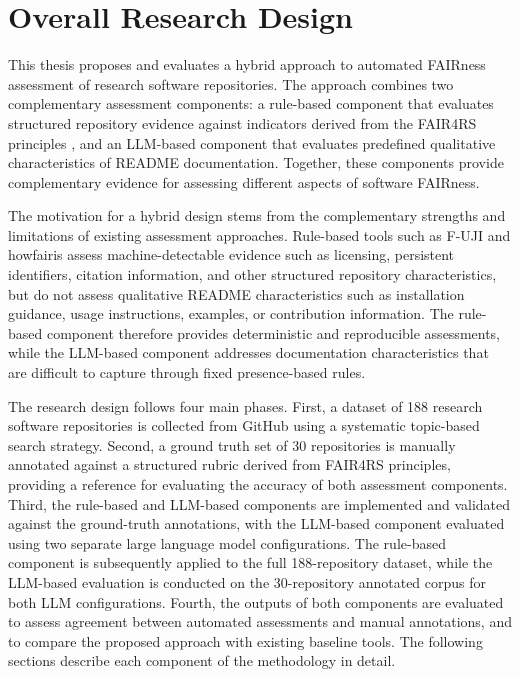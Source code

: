 \section{Overall Research Design}

This thesis proposes and evaluates a hybrid approach to automated
FAIRness assessment of research software repositories. The approach
combines two complementary assessment components: a rule-based
component that evaluates structured repository evidence against
indicators derived from the FAIR4RS principles
\cite{barker2022fair4rs}, and an LLM-based component that evaluates
predefined qualitative characteristics of README documentation.
Together, these components provide complementary evidence for
assessing different aspects of software FAIRness.

The motivation for a hybrid design stems from the complementary
strengths and limitations of existing assessment approaches.
Rule-based tools such as F-UJI \cite{fuji2021} and howfairis assess
machine-detectable evidence such as licensing, persistent
identifiers, citation information, and other structured repository
characteristics, but do not assess qualitative README characteristics
such as installation guidance, usage instructions, examples, or
contribution information. The rule-based component therefore provides
deterministic and reproducible assessments, while the LLM-based
component addresses documentation characteristics that are difficult
to capture through fixed presence-based rules.

The research design follows four main phases. First, a dataset of 
188 research software repositories is collected from GitHub using 
a systematic topic-based search strategy. Second, a ground truth 
set of 30 repositories is manually annotated against a structured 
rubric derived from FAIR4RS principles, providing a reference for 
evaluating the accuracy of both assessment components. 
Third, the rule-based and LLM-based components are implemented 
and validated against the ground-truth annotations, with the LLM-based 
component evaluated using two separate large language model configurations.
The rule-based component is subsequently applied to the full 188-repository 
dataset, while the LLM-based evaluation is conducted on the 30-repository 
annotated corpus for both LLM configurations. Fourth, the outputs of both 
components are evaluated to assess agreement between automated assessments and manual 
annotations, and to compare the proposed approach with existing baseline tools.
The following sections describe each component of the methodology 
in detail.

